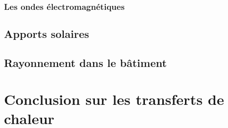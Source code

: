 \subsection{Les ondes électromagnétiques}

\section{Apports solaires}

\section{Rayonnement dans le bâtiment}

\chapter{Conclusion sur les transferts de chaleur}
